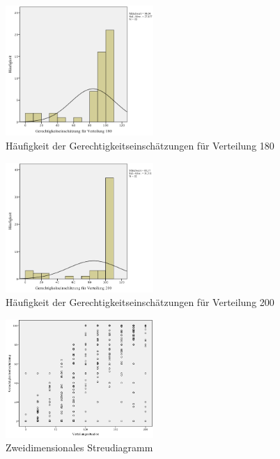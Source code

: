 \documentclass[a4paper]{thesis}
\begin{document}
\begin{figure}[H]
\centering
\includegraphics[width=0.5\textwidth]{figures/verteil_180.png}
\caption[Häufigkeit der Gerechtigkeitseinschätzungen für Verteilung 180]{Häufigkeit der Gerechtigkeitseinschätzungen für Verteilung 180}
\end{figure}

\begin{figure}[H]
\centering
\includegraphics[width=0.5\textwidth]{figures/verteil_200.png}
\caption[Häufigkeit der Gerechtigkeitseinschätzungen für Verteilung 200]{Häufigkeit der Gerechtigkeitseinschätzungen für Verteilung 200}
\end{figure}

\begin{figure}[H]
\centering
\includegraphics[width=0.5\textwidth]{figures/streu_2d.png}
\caption[Zweidimensionales Streudiagramm]{Zweidimensionales Streudiagramm}
\end{figure}
\end{document}
